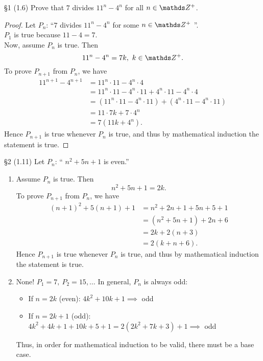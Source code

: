 \documentclass{homework}
\begin{document}
\begin{problem}{\S 1} (1.6)
   Prove that $7$ divides $11^{n}-4^{n}$ for all $n\in \Z^{+}$.
\end{problem}
\begin{proof}[Proof]
  Let $P_n$: ``$7$ divides $11^{n}-4^{n}$ for some $n\in \Z^{+}$ ''. \\
  $ P_1$ is true because $11-4=7$.\\
  Now, assume  $P_n$ is true. Then  \[
  11^{n}-4^{n} = 7k,\ k\in \Z^{+}
.\] To prove $P_{n+1}$ from $P_n$, we have
 \begin{align*}
  11^{n+1}-4^{n+1} &= 11^{n}\cdot 11-4^{n}\cdot 4 \\
  &= 11^{n}\cdot 11-4^{n}\cdot 11+4^{n}\cdot 11-4^{n}\cdot 4 \\
  &= \left( 11^{n}\cdot 11-4^{n}\cdot 11 \right) +\left( 4^{n}\cdot 11-4^{n}\cdot 11 \right)  \\
  &= 11\cdot 7k+7\cdot 4^{n} \\
  &= 7\left( 11k+4^{n} \right)
.\end{align*} Hence $P_{n+1}$ is true whenever $P_n$ is true, and thus by mathematical induction the
statement is true.
\end{proof}

\begin{problem}{\S 2}
  (1.11) Let $P_n$: `` $n^2+5n+1$ is even.''\\
  \begin{enumerate}[label=(\alph*)]
    \item Assume $P_n$ is true. Then  \[
    n^2+5n+1=2k
  .\] To prove $P_{n+1}$ from  $P_n$, we have
  \begin{align*}
    (n+1)^2+5(n+1)+1 &= n^2+2n+1+5n+5+1 \\
                     &= (n^2+5n+1)+2n+6 \\
                     &= 2k+2(n+3) \\
                     &= 2(k+n+6)
                   .\end{align*}
     Hence $P_{n+1}$ is true whenever  $P_n$ is true, and thus by
     mathematical induction the statement is true. 
   \item None! $ P_1=7,\ P_2=15,\ldots$ In general, $P_n$ is always odd:
      \begin{itemize}
        \item If $n=2k$ (even): $4k^2+10k+1 \implies$ odd
        \item If $n=2k+1$ (odd):  $4k^2+4k+1+10k+5+1=2(2k^2+7k+3)+1 \implies$ odd
     \end{itemize}
    Thus, in order for mathematical induction to be valid, there must be a base case.
  \end{enumerate}
\end{problem}
\end{document}
